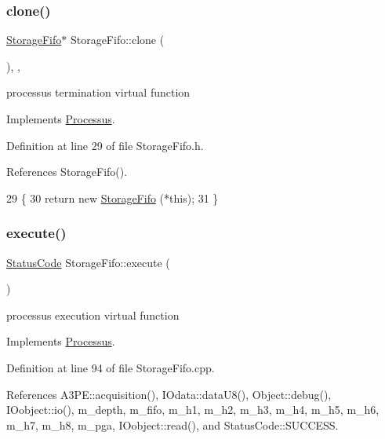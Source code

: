 \subsubsection{\texorpdfstring{clone()}{clone()}}
{\footnotesize\ttfamily \hyperlink{classStorageFifo_1_1StorageFifo}{Storage\+Fifo}$\ast$ Storage\+Fifo\+::clone (\begin{DoxyParamCaption}{ }\end{DoxyParamCaption})\hspace{0.3cm}{\ttfamily [inline]}, {\ttfamily [protected]}, {\ttfamily [virtual]}}

processus termination virtual function 

Implements \hyperlink{classProcessus_aca8856f6d6d7b7e1fe941f298dcbb502}{Processus}.



Definition at line 29 of file Storage\+Fifo.\+h.



References Storage\+Fifo().


\begin{DoxyCode}
29                       \{
30     \textcolor{keywordflow}{return} \textcolor{keyword}{new} \hyperlink{classStorageFifo_a223700b2d5de3bd59ccf76df29f979d3}{StorageFifo} (*\textcolor{keyword}{this});
31   \}
\end{DoxyCode}
\mbox{\label{classStorageFifo_aa6826007c79ce353640fd1b1836807ff}} 
\subsubsection{\texorpdfstring{execute()}{execute()}}
{\footnotesize\ttfamily \hyperlink{classStatusCode}{Status\+Code} Storage\+Fifo\+::execute (\begin{DoxyParamCaption}{ }\end{DoxyParamCaption})\hspace{0.3cm}{\ttfamily [virtual]}}

processus execution virtual function 

Implements \hyperlink{classProcessus_a63767a63a1fb0055c5aa45b21a4a5d58}{Processus}.



Definition at line 94 of file Storage\+Fifo.\+cpp.



References A3\+P\+E\+::acquisition(), I\+Odata\+::data\+U8(), Object\+::debug(), I\+Oobject\+::io(), m\+\_\+depth, m\+\_\+fifo, m\+\_\+h1, m\+\_\+h2, m\+\_\+h3, m\+\_\+h4, m\+\_\+h5, m\+\_\+h6, m\+\_\+h7, m\+\_\+h8, m\+\_\+pga, I\+Oobject\+::read(), and Status\+Code\+::\+S\+U\+C\+C\+E\+SS.


